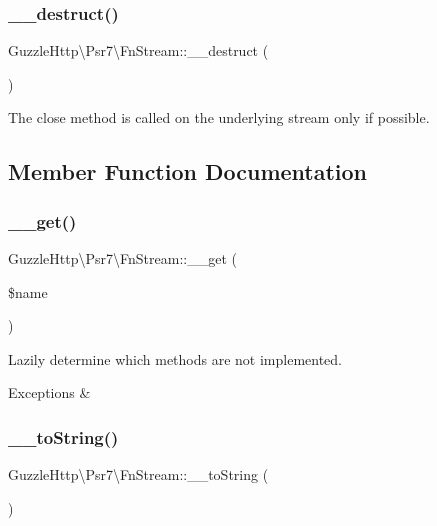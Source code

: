 \subsubsection{\texorpdfstring{\+\_\+\+\_\+destruct()}{\_\_destruct()}}
{\footnotesize\ttfamily Guzzle\+Http\textbackslash{}\+Psr7\textbackslash{}\+Fn\+Stream\+::\+\_\+\+\_\+destruct (\begin{DoxyParamCaption}{ }\end{DoxyParamCaption})}

The close method is called on the underlying stream only if possible. 

\subsection{Member Function Documentation}
\mbox{\label{classGuzzleHttp_1_1Psr7_1_1FnStream_a0cb7bdbb2b50ef87622aab43d1f9048d}} 
\subsubsection{\texorpdfstring{\+\_\+\+\_\+get()}{\_\_get()}}
{\footnotesize\ttfamily Guzzle\+Http\textbackslash{}\+Psr7\textbackslash{}\+Fn\+Stream\+::\+\_\+\+\_\+get (\begin{DoxyParamCaption}\item[{}]{\$name }\end{DoxyParamCaption})}

Lazily determine which methods are not implemented. 
\begin{DoxyExceptions}{Exceptions}
{\em } & \\
\hline
\end{DoxyExceptions}
\mbox{\label{classGuzzleHttp_1_1Psr7_1_1FnStream_afa1de61c8570fc1009d328008249c2fc}} 
\subsubsection{\texorpdfstring{\+\_\+\+\_\+to\+String()}{\_\_toString()}}
{\footnotesize\ttfamily Guzzle\+Http\textbackslash{}\+Psr7\textbackslash{}\+Fn\+Stream\+::\+\_\+\+\_\+to\+String (\begin{DoxyParamCaption}{ }\end{DoxyParamCaption})}

